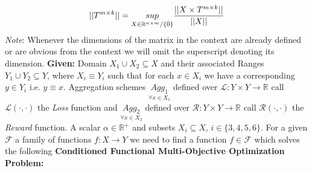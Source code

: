 \begin{equation}
   ||T^{m\times k}|| = \underset{X \in \mathbb{R}^{n\times m}/\{\Bar{0}\}}{sup} \frac{||X\times T^{m\times k}||}{||X||}
\end{equation}
\textit{Note}: Whenever the dimensions of the matrix in the context are already defined or are obvious from the context we will omit the superscript denoting its dimension.
 \label{prob_def}
\textbf{Given:}
\newline Domain $X_1\cup X_2 \subseteq X$ and their associated Ranges $Y_1\cup Y_2 \subseteq Y$, where $X_i\equiv Y_i$ such that for each $x \in X_i$ we have a corresponding $y \in Y_i$ i.e. $y\equiv x$.
\newline Aggregation schemes $\underset{\forall x\in X_1}{Agg_1}$ defined over $\mathcal{L}: Y \times Y \to \mathbb{R}$ call $\mathcal{L}(\cdot,\cdot)$ the \textit{Loss} function and $\underset{\forall x\in X_2}{Agg_2}$ defined over $\mathcal{R}: Y \times Y \to \mathbb{R}$ call $\mathcal{R}(\cdot,\cdot)$  the \textit{Reward} function.\newline
A scalar $\alpha \in \mathbb{R^+}$ and subsets $X_i \subseteq X$, $i \in \{3,4,5,6\}$.\newline
For a given $\mathcal{F}$ a family of functions $f: X \to Y$ we need to find a function $f \in \mathcal{F}$ which solves the following \newline\newline \textbf{Conditioned Functional Multi-Objective Optimization Problem:}

